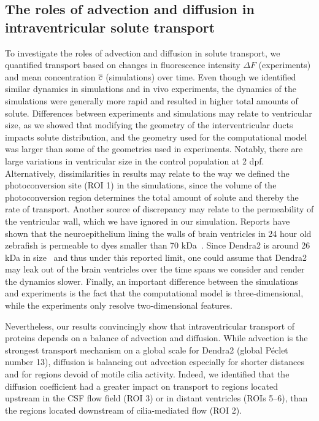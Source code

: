 \documentclass{WileyMSP-template}
\begin{document}
\subsection{The roles of advection and diffusion in intraventricular solute transport}
To investigate the roles of advection and diffusion in solute transport, we quantified transport
based on changes in fluorescence intensity $\Delta F$ (experiments) and
mean concentration $\overline{c}$ (simulations) over time.
Even though we identified similar dynamics in simulations and
in vivo experiments, the dynamics of the simulations were generally
more rapid and resulted in higher total amounts of solute.
Differences between experiments and simulations may relate to
ventricular size, as we showed that modifying the geometry of the interventricular ducts
impacts solute distribution, and the geometry used for the computational model was larger
than some of the geometries used in experiments.
Notably, there are large variations in ventricular size in the control population at 2 dpf.
Alternatively, dissimilarities in results may relate
to the way we defined the photoconversion site (ROI 1) in the simulations,
since the volume of the photoconversion region determines
the total amount of solute and thereby the rate of transport. Another source
of discrepancy may relate to the permeability of the ventricular wall,
which we have ignored in our simulation. Reports have shown that the
neuroepithelium lining the walls of brain ventricles in 24 hour old zebrafish
is permeable to dyes smaller than 70 kDa~\cite{Chang2012AnNeuroepithelium}.
Since Dendra2 is around 26 kDa in size~\cite{Gurskaya2006EngineeringLight} and
thus under this reported limit, one could assume that Dendra2 may
leak out of the brain ventricles over the time spans we consider
and render the dynamics slower. Finally, an important difference
between the simulations and experiments is the fact that the
computational model is three-dimensional, while the
experiments only resolve two-dimensional features.

Nevertheless, our results convincingly show that
intraventricular transport of proteins depends on a balance of advection and diffusion.
While advection is the strongest transport mechanism on a global scale for
Dendra2 (global Péclet number 13), diffusion is balancing out
advection especially for shorter distances and for regions devoid of motile cilia activity.
Indeed, we identified that the diffusion coefficient had a greater impact on transport to
regions located upstream in the CSF flow field (ROI 3) or in distant ventricles (ROIs 5--6),
than the regions located downstream of cilia-mediated flow (ROI 2). 
\end{document}
